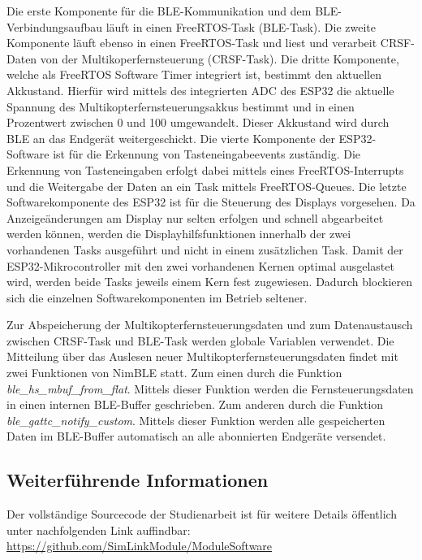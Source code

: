 Die erste Komponente für die \ac{BLE}-Kommunikation und dem \ac{BLE}-Verbindungsaufbau läuft in einen FreeRTOS-Task (\ac{BLE}-Task). Die zweite Komponente läuft ebenso in einen FreeRTOS-Task und liest und verarbeit CRSF-Daten von der Multikoperfernsteuerung (CRSF-Task). Die dritte Komponente, welche als FreeRTOS Software Timer integriert ist, bestimmt den aktuellen Akkustand. Hierfür wird mittels des integrierten \ac{ADC} des ESP32 die aktuelle Spannung des Multikopterfernsteuerungsakkus bestimmt und in einen Prozentwert zwischen 0 und 100 umgewandelt. Dieser Akkustand wird durch \ac{BLE} an das Endgerät weitergeschickt. Die vierte Komponente der ESP32-Software ist für die Erkennung von Tasteneingabeevents zuständig. Die Erkennung von Tasteneingaben erfolgt dabei mittels eines FreeRTOS-Interrupts und die Weitergabe der Daten an ein Task mittels FreeRTOS-Queues. Die letzte Softwarekomponente des ESP32 ist für die Steuerung des Displays vorgesehen. Da Anzeigeänderungen am Display nur selten erfolgen und schnell abgearbeitet werden können, werden die Displayhilfsfunktionen innerhalb der zwei vorhandenen Tasks ausgeführt und nicht in einem zusätzlichen Task. Damit der ESP32-Mikrocontroller mit den zwei vorhandenen Kernen optimal ausgelastet wird, werden beide Tasks jeweils einem Kern fest zugewiesen. Dadurch blockieren sich die einzelnen Softwarekomponenten im Betrieb seltener.

Zur Abspeicherung der Multikopterfernsteuerungsdaten und zum Datenaustausch zwischen CRSF-Task und \ac{BLE}-Task werden globale Variablen verwendet. Die Mitteilung über das Auslesen neuer Multikopterfernsteuerungsdaten findet mit zwei Funktionen von NimBLE statt. Zum einen durch die Funktion \textit{ble\_hs\_mbuf\_from\_flat}. Mittels dieser Funktion werden die Fernsteuerungsdaten in einen internen \ac{BLE}-Buffer geschrieben. Zum anderen durch die Funktion \textit{ble\_gattc\_notify\_custom}. Mittels dieser Funktion werden alle gespeicherten Daten im \ac{BLE}-Buffer automatisch an alle abonnierten Endgeräte versendet.

\subsection{Weiterführende Informationen}
Der vollständige Sourcecode der Studienarbeit ist für weitere Details öffentlich unter nachfolgenden Link auffindbar: \url{https://github.com/SimLinkModule/ModuleSoftware}

